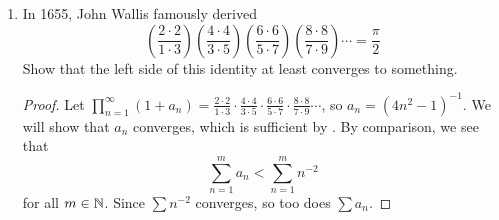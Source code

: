 \begin{problem}
\begin{enumerate}[label=(\alph*)]
    \item In 1655, John Wallis famously derived
      \[
        \left( \frac{2 \cdot 2}{1 \cdot 3} \right) \left( \frac{4 \cdot 4}{3 \cdot 5} \right) \left( \frac{6 \cdot 6}{5 \cdot 7} \right) \left( \frac{8 \cdot 8}{7 \cdot 9} \right) \cdots = \frac{\pi}{2}
      \]
      Show that the left side of this identity at least converges to something.

      \begin{proof}
        Let $\prod_{n=1}^{\infty} (1 + a_{n}) = \frac{2 \cdot 2}{1 \cdot 3} \cdot \frac{4 \cdot 4}{3 \cdot 5} \cdot \frac{6 \cdot 6}{5 \cdot 7} \cdot \frac{8 \cdot 8}{7 \cdot 9} \cdots$, so $a_{n} = (4n^{2} -1)^{-1}$.
        We will show that $a_{n}$ converges, which is sufficient by .
        By comparison, we see that
        \[
          \sum_{n=1}^{m} a_{n} < \sum_{n=1}^{m} n^{-2}
        \]
        for all $m \in \mathbb{N}$.
        Since $\sum n^{-2}$ converges, so too does $\sum a_{n}$.
      \end{proof}

  \end{enumerate}

\end{problem}
